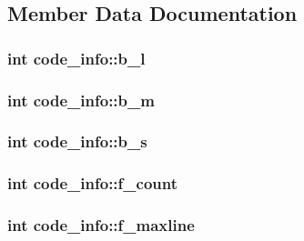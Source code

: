 \subsection{Member Data Documentation}
\hypertarget{structcode__info_a06f6c405ef67eb10711dc4fbc90e52c2}{
\subsubsection[{b\+\_\+l}]{\setlength{\rightskip}{0pt plus 5cm}int code\+\_\+info\+::b\+\_\+l}}\label{structcode__info_a06f6c405ef67eb10711dc4fbc90e52c2}
\hypertarget{structcode__info_a4dc2ea78ef6f9f8f1fea89fd42f7bf18}{
\subsubsection[{b\+\_\+m}]{\setlength{\rightskip}{0pt plus 5cm}int code\+\_\+info\+::b\+\_\+m}}\label{structcode__info_a4dc2ea78ef6f9f8f1fea89fd42f7bf18}
\hypertarget{structcode__info_a881e5abdce42a2de03dd079ee7ae3304}{
\subsubsection[{b\+\_\+s}]{\setlength{\rightskip}{0pt plus 5cm}int code\+\_\+info\+::b\+\_\+s}}\label{structcode__info_a881e5abdce42a2de03dd079ee7ae3304}
\hypertarget{structcode__info_a091007c87af472a025bc06633218e344}{
\subsubsection[{f\+\_\+count}]{\setlength{\rightskip}{0pt plus 5cm}int code\+\_\+info\+::f\+\_\+count}}\label{structcode__info_a091007c87af472a025bc06633218e344}
\hypertarget{structcode__info_a8a9fc76d0701714e834a52a66b82156e}{
\subsubsection[{f\+\_\+maxline}]{\setlength{\rightskip}{0pt plus 5cm}int code\+\_\+info\+::f\+\_\+maxline}}\label{structcode__info_a8a9fc76d0701714e834a52a66b82156e}
